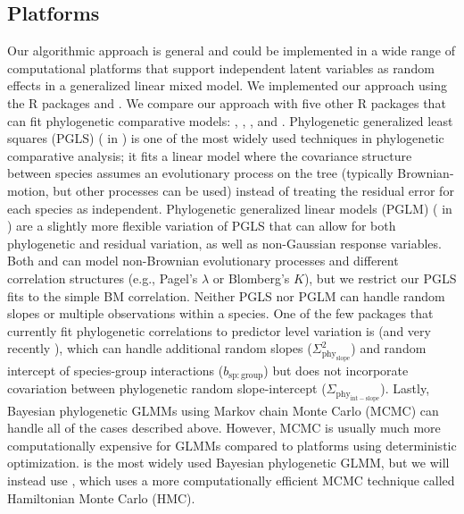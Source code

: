 \documentclass[12pt]{article}
\begin{document}
\subsection*{Platforms}

Our algorithmic approach is general and could be implemented in a wide range of computational platforms that support independent latent variables as random effects in a generalized linear mixed model. 
We implemented our approach using the R packages  \citep{bates2015fitting} and  \citep{brooks2017glmmTMB}.
We compare our approach with five other R packages that can fit phylogenetic comparative models:  \citep{pinheiro2014r},  \citep{ho2014phylolm},  \citep{pearse2015pez}, and  \citep{burkner2018brms}.
Phylogenetic generalized least squares (PGLS) ( in ) is one of the most widely used techniques in phylogenetic comparative analysis; it fits a linear model where the covariance structure between species assumes an evolutionary process on the tree (typically Brownian-motion, but other processes can be used) instead of treating the residual error for each species as independent.
Phylogenetic generalized linear models (PGLM) ( in ) are a slightly more flexible variation of PGLS that can allow for both phylogenetic and residual variation, as well as non-Gaussian response variables.
Both  and  can model non-Brownian evolutionary processes and different correlation structures (e.g., Pagel's $\lambda$ or Blomberg's $K$), but we restrict our PGLS fits to the simple BM correlation. 
Neither PGLS nor PGLM can handle random slopes or multiple observations within a species.
One of the few packages that currently fit phylogenetic correlations to predictor level variation is  (and very recently ), which can handle additional random slopes ($\Sigma^2_{\mathrm{phy_{slope}}}$) and random intercept of species-group interactions ($b_{\mathrm{sp:group}}$) but does not incorporate covariation between phylogenetic random slope-intercept ($\Sigma_{\mathrm{phy_{int-slope}}}$).
Lastly, Bayesian phylogenetic GLMMs using Markov chain Monte Carlo (MCMC) can handle all of the cases described above. 
However, MCMC is usually much more computationally expensive for GLMMs compared to platforms using deterministic optimization.
 \citep{hadfield2010general} is the most widely used Bayesian phylogenetic GLMM, but we will instead use , which uses a more computationally efficient MCMC technique called Hamiltonian Monte Carlo (HMC)\citep{duane1987hybrid}.
 
\end{document}
